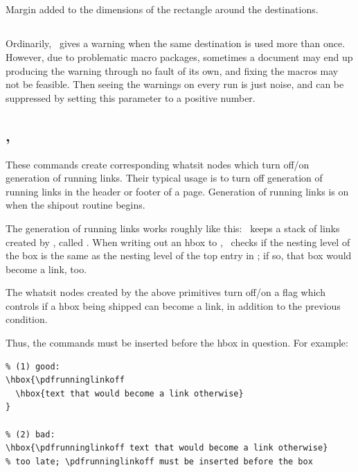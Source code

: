 \documentclass{pdftexmanual}
\begin{document}
\subsection{}

Margin added to the dimensions of the rectangle around the destinations.

\subsection{}

Ordinarily, \PDFTEX\ gives a warning when the same destination is used
more than once. However, due to problematic macro packages, sometimes a
document may end up producing the warning through no fault of its own,
and fixing the macros may not be feasible. Then seeing the warnings on
every run is just noise, and can be suppressed by setting this parameter
to a positive number. 

\subsection{, }

These commands create corresponding whatsit nodes which turn off/on
generation of running links. Their typical usage is to turn off
generation of running links in the header or footer of a page.
Generation of running links is on when the shipout routine begins.

The generation of running links works roughly like this: \PDFTEX\ keeps
a stack of links created by , called
. When writing out an hbox to \PDF, \PDFTEX\ checks
if the nesting level of the box is the same as the nesting level of the
top entry in ; if so, that box would become a link,
too.

The whatsit nodes created by the above primitives turn off/on a flag
which controls if a hbox being shipped can become a link, in addition to
the previous condition.

Thus, the commands must be inserted before the hbox in question. For example:

\begin{verbatim}
% (1) good:
\hbox{\pdfrunninglinkoff
  \hbox{text that would become a link otherwise}
}

% (2) bad:
\hbox{\pdfrunninglinkoff text that would become a link otherwise} 
% too late; \pdfrunninglinkoff must be inserted before the box
\end{verbatim}
\end{document}
